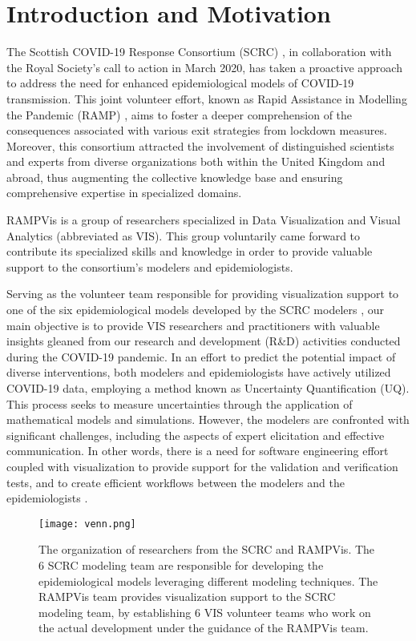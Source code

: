 \section{Introduction and Motivation}
\label{sec:intro}

The Scottish COVID-19 Response Consortium (SCRC) \cite{2020University}, in collaboration with the Royal Society's call to action in March 2020, has taken a proactive approach to address the need for enhanced epidemiological models of COVID-19 transmission.
This joint volunteer effort, known as Rapid Assistance in Modelling the Pandemic (RAMP) \cite{2020Rapid}, aims to foster a deeper comprehension of the consequences associated with various exit strategies from lockdown measures.
Moreover, this consortium attracted the involvement of distinguished scientists and experts from diverse organizations both within the United Kingdom and abroad, thus augmenting the collective knowledge base and ensuring comprehensive expertise in specialized domains.

RAMPVis \cite{2020Visualization} is a group of researchers specialized in Data Visualization and Visual Analytics (abbreviated as VIS).
This group voluntarily came forward to contribute its specialized skills and knowledge in order to provide valuable support to the consortium's modelers and epidemiologists.

Serving as the volunteer team responsible for providing visualization support to one of the six epidemiological models developed by the SCRC modelers \cite{chen2022RAMPVIS}, our main objective is to provide VIS researchers and practitioners with valuable insights gleaned from our research and development (R\&D) activities conducted during the COVID-19 pandemic.
In an effort to predict the potential impact of diverse interventions, both modelers and epidemiologists have actively utilized COVID-19 data, employing a method known as Uncertainty Quantification (UQ).
This process seeks to measure uncertainties through the application of mathematical models and simulations.
However, the modelers are confronted with significant challenges, including the aspects of expert elicitation and effective communication.
In other words, there is a need for software engineering effort coupled with visualization to provide support for the validation and verification tests, and to create efficient workflows between the modelers and the epidemiologists \cite{ackland2022Royal}.

\begin{figure}[tb!]
    \centering
    \texttt{[image: venn.png]}
    \caption{The organization of researchers from the SCRC and RAMPVis. The 6 SCRC modeling team are responsible for developing the epidemiological models leveraging different modeling techniques. The RAMPVis team provides visualization support to the SCRC modeling team, by establishing 6 VIS volunteer teams who work on the actual development under the guidance of the RAMPVis team.
    }
    \label{fig:venn}

\end{figure}

